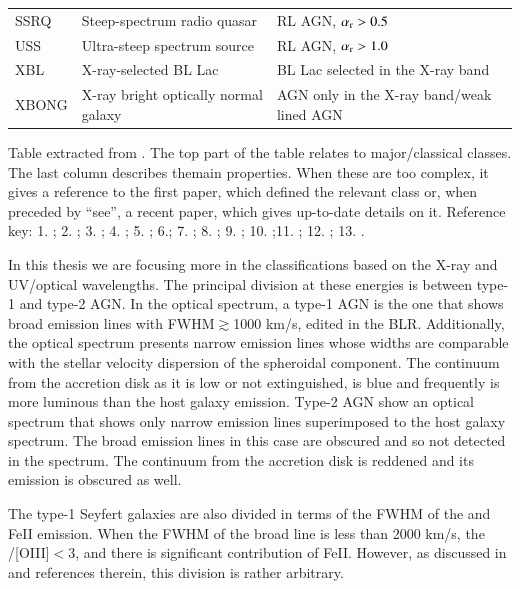 \begin{tiny}
\begin{table}
\begin{center}
\begin{tabular}{lll}
SSRQ &Steep-spectrum radio quasar & RL AGN, $\alpha_{\rm r} > 0.5$   \\
USS & Ultra-steep spectrum source & RL AGN, $\alpha_{\rm r} > 1.0$ \\
XBL & X-ray-selected BL Lac & BL Lac selected in the X-ray band\\
XBONG & X-ray bright optically normal galaxy & AGN only in the X-ray band/weak lined AGN\\
\hline
\end{tabular}
\scriptsize Table extracted from \cite{padovani17}. The top part of the table relates to major/classical classes. The last column describes themain properties. When these are too complex, it gives a reference to the first paper, which defined the relevant class or, when preceded by ``see'', a recent paper, which gives up-to-date details on it. Reference key: 1. \cite{padovani16}; 2. \cite{fanaroff74}; 3. \cite{giommi12}; 4. \cite{weymann81}; 5. \cite{ghisellini10}; 6.\cite{odea91}; 7. \cite{padovani95}; 8. \cite{laing94}; 9. \cite{heckman14};  10. \cite{ho08};11. \cite{osterbrock85}; 12. \cite{sulentic02}; 13. \cite{osterbrock81}.

\label{sec1:tab_clas}
\end{center}
\end{table}

\end{tiny}

In this thesis we are focusing more in the classifications based on the X-ray and UV/optical wavelengths. The principal division at these energies is between type-1 and type-2 AGN. In the optical spectrum, a type-1 AGN is the one that shows broad emission lines with FWHM$\gtrsim$1000 km/s, edited in the BLR. Additionally, the optical spectrum presents narrow emission lines whose widths are comparable with the stellar velocity dispersion of the spheroidal component. The continuum from the accretion disk as it is low or not extinguished, is blue and frequently is more luminous than the host galaxy emission. Type-2 AGN show an optical spectrum that shows only narrow emission lines superimposed to the host galaxy spectrum. The broad emission lines in this case are obscured and so not detected in the spectrum. The continuum from the accretion disk is reddened and its emission is obscured as well.

The type-1 Seyfert galaxies are also divided in terms of the FWHM of the \Hb and FeII emission. When the FWHM of the broad \Hb line is less than 2000 km/s, the \Hb/[OIII]$<$3, and there is significant contribution of FeII. However, as discussed in \cite{veroncetty00} and references therein, this division is rather arbitrary. 


